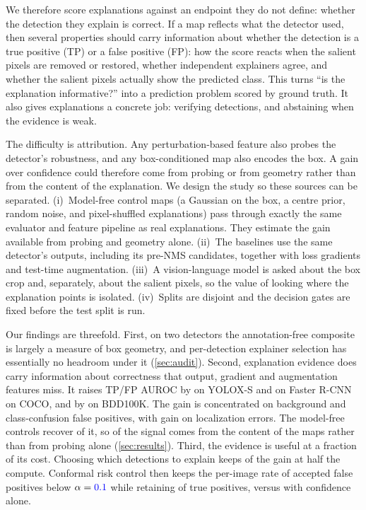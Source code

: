 We therefore score explanations against an endpoint they do not define:
whether the detection they explain is correct. If a map reflects what the
detector used, then several properties should carry information about whether
the detection is a true positive (TP) or a false positive (FP): how the score
reacts when the salient pixels are removed or restored, whether independent
explainers agree, and whether the salient pixels actually show the predicted
class. This turns ``is the explanation informative?'' into a prediction
problem scored by ground truth. It also gives explanations a concrete job:
verifying detections, and abstaining when the evidence is weak.

The difficulty is attribution. Any perturbation-based feature also probes
the detector's robustness, and any box-conditioned map also encodes the box.
A gain over confidence could therefore come from probing or from geometry
rather than from the content of the explanation. We design the study so these
sources can be separated.
(i)~Model-free control maps (a Gaussian on the box, a centre prior, random
noise, and pixel-shuffled explanations) pass through exactly the same
evaluator and feature pipeline as real explanations. They estimate the gain
available from probing and geometry alone.
(ii)~The baselines use the same detector's outputs, including its pre-NMS
candidates, together with loss gradients and test-time augmentation.
(iii)~A vision-language model is asked about the box crop and, separately,
about the salient pixels, so the value of looking where the explanation
points is isolated.
(iv)~Splits are disjoint and the decision gates are fixed before the test
split is run.

Our findings are threefold. First, on two detectors the annotation-free
composite is largely a measure of box geometry, and per-detection explainer
selection has essentially no headroom under it
(\cref{sec:audit}). Second, explanation evidence does carry information about
correctness that output, gradient and augmentation features miss. It raises
TP/FP AUROC by  on YOLOX-S and  on Faster R-CNN on
COCO, and by  on BDD100K. The gain is concentrated on background
and class-confusion false positives, with  gain on localization
errors. The model-free controls recover  of it, so 
of the signal comes from the content of the maps rather than from probing
alone (\cref{sec:results}). Third, the evidence is useful at a fraction of its
cost. Choosing which detections to explain keeps  of the gain at
half the compute. Conformal risk control then keeps the per-image rate of
accepted false positives below $\alpha=\textcolor{blue}{0.1}$ while retaining
 of true positives, versus  with confidence alone.

